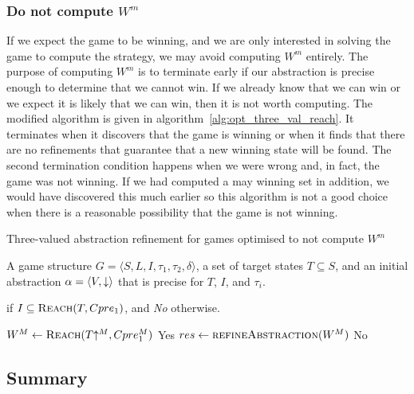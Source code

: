 \subsubsection{Do not compute $W^m$}

If we expect the game to be winning, and we are only interested in solving the game to compute the strategy, we may avoid computing $W^m$ entirely. The purpose of computing $W^m$ is to terminate early if our abstraction is precise enough to determine that we cannot win. If we already know that we can win or we expect it is likely that we can win, then it is not worth computing. The modified algorithm is given in algorithm~\ref{alg:opt_three_val_reach}. It terminates when it discovers that the game is winning or when it finds that there are no refinements that guarantee that a new winning state will be found. The second termination condition happens when we were wrong and, in fact, the game was not winning. If we had computed a may winning set in addition, we would have discovered this much earlier so this algorithm is not a good choice when there is a reasonable possibility that the game is not winning.

\begin{algorithm}
\caption{Three-valued abstraction refinement for games optimised to not compute $W^m$}
\label{alg:opt_three_val_reach}

\begin{algorithmic}[1]

\Require A game structure $G = \langle S, L, I, \tau_1, \tau_2, \delta \rangle$, a set 
of target states $T\subseteq S$, and an initial abstraction $\alpha=\langle V, \mathord{\downarrow} \rangle$
that is precise for $T$, $I$, and $\tau_i$.

 if $I \subseteq \textsc{Reach}(T, Cpre_1)$, and {\it No} otherwise.


    \Loop
        \State $W^M \gets \textsc{Reach}(T\mathord{\uparrow^M}, Cpre_1^M)$
            \State\Return Yes
        \Else       
            \State $res \gets \Call{refineAbstraction}{W^M}$
                \State\Return No
            \EndIf
        \EndIf
    \EndLoop
\EndFunction

\end{algorithmic}
\end{algorithm}

\subsection{Summary}

